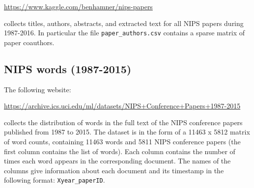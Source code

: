\documentclass[11pt]{article}
\begin{document}
\url{https://www.kaggle.com/benhamner/nips-papers}

\noindent collects titles, authors, abstracts, and extracted text for all NIPS papers during 1987-2016. In particular the file {\texttt{paper\_authors.csv}} contains a sparse matrix of paper coauthors. 

\subsection{NIPS words (1987-2015)} The following website:

\url{https://archive.ics.uci.edu/ml/datasets/NIPS+Conference+Papers+1987-2015}

\noindent collects the distribution of words in the full text of the NIPS conference papers published from 1987 to 2015. The dataset is in the form of a 11463 x 5812 matrix of word counts, containing 11463 words and 5811 NIPS conference papers (the first column contains the list of words). Each column contains the number of times each word appears in the corresponding document. The names of the columns give information about each document and its timestamp in the following format: {\texttt{Xyear\_paperID}}. 


%
%
% 
%
%
%
%
%
%
\end{document}
